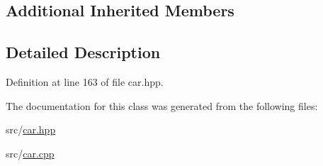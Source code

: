 \subsection*{Additional Inherited Members}


\subsection{Detailed Description}


Definition at line 163 of file car.\-hpp.



The documentation for this class was generated from the following files\-:\begin{DoxyCompactItemize}
\item 
src/\hyperlink{car_8hpp}{car.\-hpp}\item 
src/\hyperlink{car_8cpp}{car.\-cpp}\end{DoxyCompactItemize}
